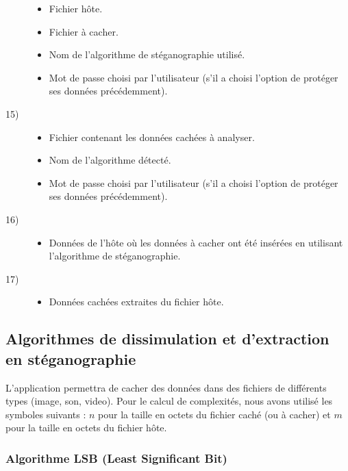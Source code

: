 \documentclass[11pt]{article}
\begin{document}
\begin{description}
\begin{itemize}
\item Fichier hôte.
\item Fichier à cacher.
\item Nom de l'algorithme de stéganographie utilisé.
\item Mot de passe choisi par l'utilisateur (s'il a choisi l'option de protéger
    ses données précédemment).
\end{itemize}
\item[15)]
\begin{itemize}
\item Fichier contenant les données cachées à analyser.
\item Nom de l'algorithme détecté.
\item Mot de passe choisi par l'utilisateur (s'il a choisi l'option de protéger
    ses données précédemment).
\end{itemize}
\item[16)]
\begin{itemize}
\item Données de l'hôte où les données à cacher ont été insérées en utilisant
    l'algorithme de stéganographie.
\end{itemize}
\item[17)]
\begin{itemize}
\item Données cachées extraites du fichier hôte.
\end{itemize}
\end{description}

\small
\subsection{Algorithmes de dissimulation et d'extraction en stéganographie}

L'application permettra de cacher des données dans des fichiers de différents
types (image, son, video). Pour le calcul de complexités, nous avons utilisé les symboles suivants : 
$n$ pour la taille en octets du fichier caché (ou à cacher) et $m$ pour la taille en octets du fichier hôte. 

\subsubsection{Algorithme LSB (Least Significant Bit)}
\end{document}
